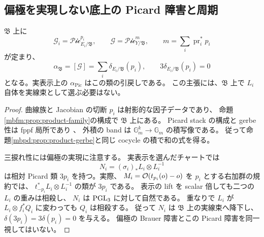 \subsection{偏極を実現しない底上の Picard 障害と周期}

\begin{proposition}
\label{mbic:prop:intrinsic-picard}
$\mathfrak B$ 上に
\[
 \mathscr G_i=\mathcal{Pic}^{p_i}_{E_i/\mathfrak B},
 \qquad
 \mathscr G=\mathcal{Pic}^{m}_{Y/\mathfrak B},
 \qquad m=\sum_i\operatorname{pr}_i^*p_i
\]
が定まり、
\begin{equation}\label{mbic:eq:intrinsic-alpha}
 \alpha_{\mathfrak B}=[\mathscr G]
      =\sum_i\delta_{E_i/\mathfrak B}(p_i),\qquad
 3\delta_{E_i/\mathfrak B}(p_i)=0
\end{equation}
となる。実表示上の $\alpha_{\mathrm{Pic}}$ はこの類の引戻しである。
この主張には、$\mathfrak B$ 上で $L_i$ 自体を実線束として選ぶ必要はない。
\end{proposition}
\begin{proof}
曲線族と Jacobian の切断 $p_i$ は射影的な因子データであり、
命題\ref{mbfm:prop:product-family}の構成で $\mathfrak B$ 上にある。
Picard stack の構成と gerbe 性は fppf 局所であり
\cite[Tag~0DME]{NFMStacksPicardGerbe}、
外積の band は $\mathbb G_m^k\to\mathbb G_m$ の積写像である。
従って命題\ref{mbpd:prop:product-gerbe}と同じ cocycle の積で和の式を得る。

三捩れ性には偏極の実現に注意する。
実表示を選んだチャートでは
\[
 N_i=(\sigma_i)_*L_i\otimes L_i^{-1}
\]
は相対 Picard 類 $3p_i$ を持つ。実際、
$M_i=\mathcal O(t_{p_i}(o)-o)$ を $p_i$ とする右加群の規約では、
$t_{-p_i}^*L_i\otimes L_i^{-1}$ の類が $3p_i$ である。
表示の lift を scalar 倍しても二つの $L_i$ の重みは相殺し、
$N_i$ は $\operatorname{PGL}_3$ に対して自然である。
重なりで $L_i$ が $L_i\otimes f_i^*Q_i$ に変わっても $Q_i$ は相殺する。
従って $N_i$ は $\mathfrak B$ 上の実線束へ降下し、
$\delta(3p_i)=3\delta(p_i)=0$ を与える。
偏極の Brauer 障害とこの Picard 障害を同一視してはいない。
\end{proof}

